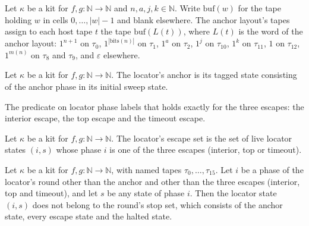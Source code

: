 \begin{definition}
\label{Turing.NTimeDiag.qyLayT}
\leanok
{}
Let $\kappa$ be a kit for $f, g : \mathbb{N} \to \mathbb{N}$ and $n, a, j, k \in \mathbb{N}$. Write
$\mathrm{buf}(w)$ for the tape holding $w$ in cells $0, \dots, |w| - 1$ and blank elsewhere. The
anchor layout's tapes assign to each host tape $t$ the tape $\mathrm{buf}(L(t))$, where $L(t)$ is
the word of the anchor layout: $1^{n+1}$ on $\tau_0$, $1^{|\mathrm{bits}(n)|}$ on $\tau_1$, $1^a$
on $\tau_2$, $1^j$ on $\tau_{10}$, $1^k$ on $\tau_{11}$, $1$ on $\tau_{12}$, $1^{m(n)}$ on $\tau_8$
and $\tau_9$, and $\varepsilon$ elsewhere.
\end{definition}

\begin{definition}
\label{Turing.NTimeDiag.qyAnc}
\leanok
{}
Let $\kappa$ be a kit for $f, g : \mathbb{N} \to \mathbb{N}$. The locator's anchor is its tagged
state consisting of the anchor phase in its initial sweep state.
\end{definition}

\begin{definition}
\label{Turing.NTimeDiag.QyLK.isEsc}
\leanok
{}
The predicate on locator phase labels that holds exactly for the three escapes: the interior
escape, the top escape and the timeout escape.
\end{definition}

\begin{definition}
\label{Turing.NTimeDiag.qyLocE}
\leanok
{}
Let $\kappa$ be a kit for $f, g : \mathbb{N} \to \mathbb{N}$. The locator's escape set is the set of
live locator states $(i, s)$ whose phase $i$ is one of the three escapes (interior, top or
timeout).
\end{definition}

\begin{theorem}
\label{Turing.NTimeDiag.qy_notStop}
\leanok
{}
Let $\kappa$ be a kit for $f, g : \mathbb{N} \to \mathbb{N}$, with named tapes $\tau_0, \dots,
\tau_{15}$. Let $i$ be a phase of the locator's round other than the anchor and other than the
three escapes (interior, top and timeout), and let $s$ be any state of phase $i$. Then the locator
state $(i, s)$ does not belong to the round's stop set, which consists of the anchor state, every
escape state and the halted state.
\end{theorem}

